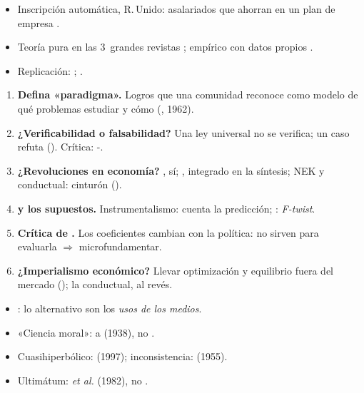 \documentclass{article}
\begin{document}
\begin{columnas}
\anexorepaso
{}
\begin{itemize}
\item Inscripción automática, R.\,Unido: asalariados que ahorran en un plan de empresa .
\item Teoría pura en las 3~grandes revistas ; empírico con datos propios .
\item Replicación: ; .
\end{itemize}
\begin{enumerate}
\item \textbf{Defina «paradigma».} Logros que una comunidad reconoce como modelo de qué problemas estudiar y cómo (, 1962).
\item \textbf{¿Verificabilidad o falsabilidad?} Una ley universal no se verifica; un caso refuta (). Crítica: -.
\item \textbf{¿Revoluciones en economía?} , sí; , integrado en la síntesis; NEK y conductual: cinturón ().
\item \textbf{ y los supuestos.} Instrumentalismo: cuenta la predicción; : \emph{F-twist}.
\item \textbf{Crítica de .} Los coeficientes cambian con la política: no sirven para evaluarla $\Rightarrow$ microfundamentar.
\item \textbf{¿Imperialismo económico?} Llevar optimización y equilibrio fuera del mercado (); la conductual, al revés.
\end{enumerate}
\begin{trampa}
\begin{itemize}
\item {}: lo alternativo son los \emph{usos de los medios}.
\item «Ciencia moral»:  a  (1938), no .
\item Cuasihiperbólico:  (1997); inconsistencia:  (1955).
\item Ultimátum:  \emph{et al.} (1982), no .
\end{itemize}
\end{trampa}

\end{columnas}
\end{document}
